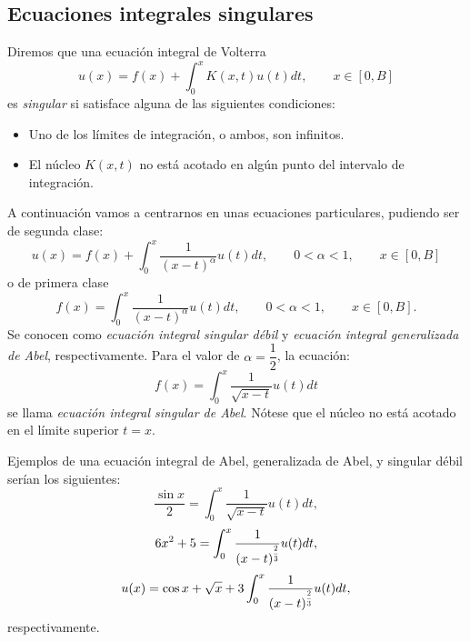 \subsection{Ecuaciones integrales singulares}
\begin{definicion}
	Diremos que una ecuación integral de Volterra
	\begin{equation}
		u(x) = f(x) + \int_0^x K(x,t)u(t)dt, \qquad x \in [0,B]
	\end{equation}
	es \textit{singular} si satisface alguna de las siguientes condiciones:
	\begin{itemize}
		\item Uno de los límites de integración, o ambos, son infinitos.
		\item El núcleo $K(x,t)$ no está acotado en algún punto del intervalo de integración.
	\end{itemize}
\end{definicion}
A continuación vamos a centrarnos en unas ecuaciones particulares, pudiendo ser de segunda clase:
\begin{equation}\label{}
	u(x) = f(x) + \int_0^x \dfrac{1}{(x-t)^\alpha}u(t)dt, \qquad 0 < \alpha < 1, \qquad x \in [0,B]
\end{equation}
o de primera clase
\begin{equation}\label{}
	f(x) = \int_0^x \dfrac{1}{(x-t)^\alpha}u(t)dt, \qquad 0 < \alpha < 1, \qquad x \in [0,B].
\end{equation}
Se conocen como \textit{ecuación integral singular débil} y \textit{ecuación integral generalizada de Abel}, respectivamente. Para el valor de $\alpha = \dfrac{1}{2}$, la ecuación:
\begin{equation}\label{}
	f(x) = \int_0^x \dfrac{1}{\sqrt{x-t}}u(t)dt
\end{equation}
se llama \textit{ecuación integral singular de Abel}. Nótese que el núcleo no está acotado en el límite superior $t = x$. 
\begin{ejemplo}
	Ejemplos de una ecuación integral de Abel, generalizada de Abel, y singular débil serían los siguientes:
	\begin{equation}\label{}
		\dfrac{\sin x}{2} = \int_0^x \dfrac{1}{\sqrt{x-t}}u(t)dt,
	\end{equation}
	\begin{equation}\label{}
		6x^2 + 5 = \int_0^x \dfrac{1}{(x-t)^{\scaleto{\dfrac{2}{3}}{12pt}}}u(t)dt,
	\end{equation}
	\begin{equation}\label{}
		u(x) = \cos x + \sqrt{x} + 3\int_0^x \dfrac{1}{(x-t)^{\scaleto{\dfrac{2}{3}}{12pt}}}u(t)dt,
	\end{equation}
	respectivamente.
\end{ejemplo}

